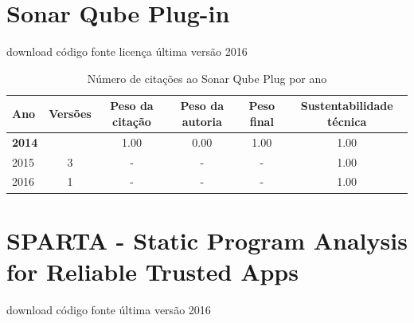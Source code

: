 \section{Sonar Qube Plug-in}
\checkmark download
\checkmark código fonte
\checkmark licença
\checkmark última versão 2016


\begin{table}[H]
\caption{Número de citações ao Sonar Qube Plug por ano}
\centering
\begin{tabular}{| l | c | c | c | c | c |}
  \hline
  Ano & Versões & Peso da citação & Peso da autoria & Peso final & Sustentabilidade técnica \\
  \hline
            {\bf 2014}
          &
          
          &
          1.00
          &
          0.00
          &
          1.00
          &
            {\color{blue} 1.00}
          \\
\hline
        2015 & 3 & - & - & -
        &
          {\color{blue} 1.00}
        \\
\hline
        2016 & 1 & - & - & -
        &
          {\color{blue} 1.00}
        \\
\hline
\end{tabular}
\end{table}



\section{SPARTA - Static Program Analysis for Reliable Trusted Apps}
\checkmark download
\checkmark código fonte
\checkmark última versão 2016


